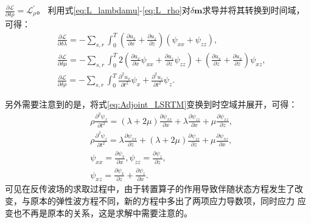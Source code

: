 $\frac{\partial\mathcal{L}}{\partial\delta\rho}=\mathcal{L}^{'}_{\rho}$。
利用式\eqref{eq:L_lambdamu}-\eqref{eq:L_rho}对$\delta\mathbf{m}$求导并将其转换到时间域，
可得：
\begin{equation}
\begin{split}
   & \frac{\partial\mathcal{L}}{\partial \delta\lambda}=-\sum_{s,r}\int^T_{0}
	(\frac{\partial u_x}{\partial x}+\frac{\partial u_z}{\partial z})(\psi_{xx}+\psi_{zz}),\\
   & \frac{\partial\mathcal{L}}{\partial \delta\mu}=-\sum_{s,r}\int^T_{0}
	2(\frac{\partial u_x}{\partial x}\psi_{xx}+\frac{\partial u_z}{\partial z}\psi_{zz})+
	(\frac{\partial u_x}{\partial z}+\frac{\partial u_x}{\partial z})\psi_{xz},\\
   & \frac{\partial\mathcal{L}}{\partial \delta\rho}=-\sum_{s,r}\int^T_{0}
	\frac{\partial^2 u_x}{\partial t^2}\psi_x+\frac{\partial^2 u_z}{\partial t^2}\psi_{z}.
    \label{eq:Gradient_lambdamurho_LSRTM}
\end{split}
\end{equation}

另外需要注意到的是，将式\eqref{eq:Adjoint_LSRTM}变换到时空域并展开，可得：
\begin{equation}
\begin{split}
   & \rho\frac{\partial^2 \psi_{x}}{\partial t^2}=	(\lambda+2\mu)\frac{\partial \psi_{xx}}{\partial x}+
		\lambda\frac{\partial \psi_{zz}}{\partial x}+\mu\frac{\partial \psi_{xz}}{\partial z},\\
   & \rho\frac{\partial^2 \psi_{z}}{\partial t^2}=	\lambda\frac{\partial \psi_{xx}}{\partial z}+
		(\lambda+2\mu)\frac{\partial \psi_{zz}}{\partial z}+\mu\frac{\partial \psi_{xz}}{\partial x},\\
   & \psi_{xx}=\frac{\partial \psi_x}{\partial x}, \psi_{zz}=\frac{\partial \psi_z}{\partial z},\\
   & \psi_{xz}=\frac{\partial \psi_x}{\partial z} + \frac{\partial \psi_z}{\partial x}.
    \label{eq:Time_Adjoint_WE_LSRTM}
\end{split}
\end{equation}
可见在反传波场的求取过程中，由于转置算子的作用导致伴随状态方程发生了改变，与原本的弹性波方程不同，新的方程中多出了两项应力导数项，同时应力
应变也不再是原本的关系，这是求解中需要注意的。
